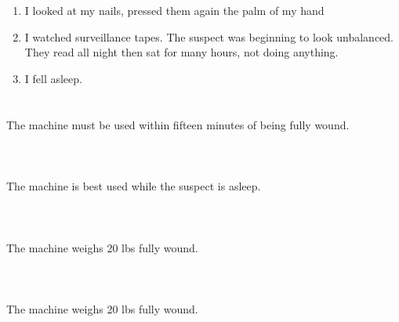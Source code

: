 \documentclass{article}
\begin{document}
    \newpage
    
    \section{}
    
    \begin{enumerate}
    
    \item I looked at my nails, pressed them again the palm of my hand\\
    
    \item I watched surveillance tapes. The suspect was beginning to look unbalanced. They read all night then sat for many hours, not doing anything.\\
    
    \item I fell asleep.\\
    
    \end{enumerate}
     
    \newpage
    
    \section{}
    The machine must be used within fifteen minutes of being fully wound.\\\\ 
    \newpage
    
    \section{}
    The machine is best used while the suspect is asleep.\\\\ 
    \newpage
    
    \section{}
    The machine weighs 20 lbs fully wound.\\\\ 
    \newpage
    
    \section{}
    The machine weighs 20 lbs fully wound.\\\\ 
    \newpage
    
\end{document}
